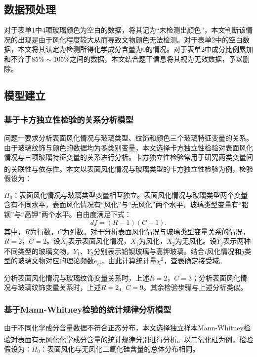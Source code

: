 \documentclass[withoutpreface,bwprint]{cumcmthesis} %
\begin{document}
\subsection{数据预处理}

对于表单1中4项玻璃颜色为空白的数据，将其记为“未检测出颜色”，本文判断该情况的出现是由于风化程度较大从而导致文物颜色无法检测。对于表单2中的空白数据，本文将其认定为检测所得化学成分含量为0的情况。对于表单2中成分比例累加和不介于85$\% \sim 105\%$之间的数据，本文结合题干信息将其视为无效数据，予以删除。

\subsection{模型建立}

\subsubsection{基于卡方独立性检验的关系分析模型}

问题一要求分析表面风化情况与玻璃类型、纹饰和颜色三个玻璃特征变量的关系。由于玻璃纹饰与颜色的数据均为多类别变量，本文选择卡方独立性检验对表面风化情况与三项玻璃特征变量的关系进行分析。卡方独立性检验常用于研究两类变量间的关联性与依存性\textsuperscript{\cite{ref3}}。本文以表面风化情况与玻璃类型的卡方独立性检验为例，检验假设为：

$H_0$：表面风化情况与玻璃类型变量相互独立。表面风化情况与玻璃类型两个变量含有不同水平，表面风化情况有“风化”与“无风化”两个水平，玻璃类型变量有“铅钡”与“高钾”两个水平。自由度满足下式：
\begin{equation}
df = (R-1)(C-1).
\end{equation}
其中，$R$为行数，$C$为列数。对于分析表面风化情况与玻璃类型变量关系的情况，$R=2$，$C=2$。设$X_i$表示表面风化情况，$X_1$为风化，$X_2$为无风化。设$Y_j$表示两种不同类型的玻璃文物，$Y_1$、$Y_2$分别表示铅钡玻璃与高钾玻璃。结合$i$风化情况和$j$类型的玻璃文物对应的理论频数$e_{ij}$，由此计算统计量$\chi ^ { 2 }$，查表确定接受域。

分析表面风化情况与玻璃纹饰变量关系时，上述$R = 2$，$C = 3$；分析表面风化情况与玻璃纹饰变量关系时，上述$R = 2$，$C = 9$。其余检验步骤与上述分析类似。

\subsubsection{基于Mann-Whitney检验的统计规律分析模型}\label{mw}

由于不同化学成分含量数据不符合正态分布，本文选择独立样本Mann-Whitney检验对表面有无风化化学成分含量的统计规律分别进行分析\textsuperscript{\cite{ref2}}。以二氧化硅为例，检验假设为：$H_0$：表面风化与无风化二氧化硅含量的总体分布相同。
\end{document}
